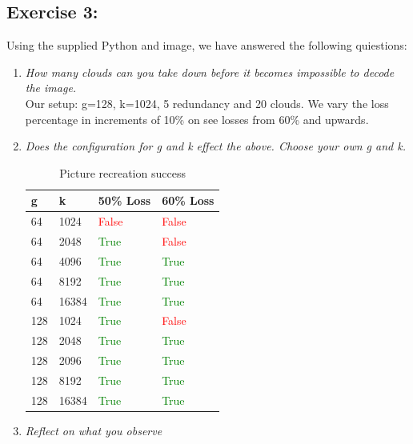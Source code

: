 \subsection{Exercise 3:}
Using the supplied Python and image, we have answered the following quiestions:
\begin{enumerate}
    \item \textit{How many clouds can you take down before it becomes impossible to decode the image.}\\
    Our setup: g=128, k=1024, 5 redundancy and 20 clouds.
    We vary the loss percentage in increments of 10\% on see losses from 60\% and upwards.
    \item \textit{Does the configuration for g and k effect the above. Choose your own g and k.}\\
    \begin{table}[H]
        \begin{tabularx}{\textwidth}{|Y|Y|Y|Y|}
            \hline
            g & k & 50\% Loss & 60\% Loss \\\hline
            64 & 1024 & \textcolor{red}{False}& \textcolor{red}{False}\\\hline
            64 & 2048 & \textcolor{green}{True} & \textcolor{red}{False}\\\hline
            64 & 4096 & \textcolor{green}{True} & \textcolor{green}{True}\\\hline
            64 & 8192 & \textcolor{green}{True} & \textcolor{green}{True}\\\hline
            64 & 16384 & \textcolor{green}{True} & \textcolor{green}{True}\\\hline
            128 & 1024 & \textcolor{green}{True} & \textcolor{red}{False}\\\hline
            128 & 2048 & \textcolor{green}{True} & \textcolor{green}{True}\\\hline
            128 & 2096 & \textcolor{green}{True} & \textcolor{green}{True}\\\hline
            128 & 8192 & \textcolor{green}{True} & \textcolor{green}{True}\\\hline
            128 & 16384 & \textcolor{green}{True} & \textcolor{green}{True}\\\hline
        \end{tabularx}
        \caption{Picture recreation success}
        \label{tab:Exercise3}
    \end{table}

    \item \textit{Reflect on what you observe}\\
    
\end{enumerate}




